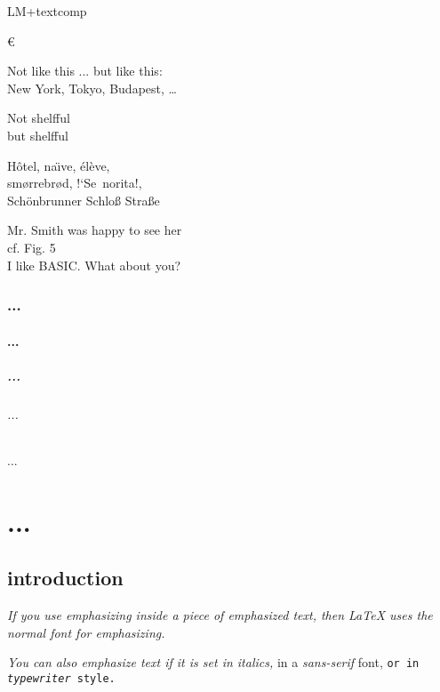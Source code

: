 \documentclass[a4paper,11pt]{book}
\begin{document}
	\texteuro
	
	LM+textcomp \texteuro
	
	\euro
	
	Not like this ... but like
	this:\\ New York, Tokyo,
	Budapest, \ldots
	
	Not shelfful\\
	but shelf\mbox{}ful
	
	H\^otel, na\"\i ve, \'el\`eve,\\
	sm\o rrebr\o d, !‘Se\ norita!,\\
	Sch\"onbrunner Schlo\ss{}
	Stra\ss e
	
	Mr. Smith was happy to see her\\
	cf. Fig. 5\\\frenchspacing
	I like BASIC\@. \frenchspacing What about you?
	
	\section{...}
	\subsection{...}
	\subsubsection{...}
	\paragraph{...}
	\subparagraph{...}
	
	\part{...}
	
	\chapter{introduction}
	
	\emph{If you use
		emphasizing inside a piece
		of emphasized text, then
		\LaTeX{} uses the
		\emph{normal} font for
		emphasizing.}
	
	
	\textit{You can also
		\emph{emphasize} text if
		it is set in italics,}
	\textsf{in a
		\emph{sans-serif} font,}
	\texttt{or in
		\emph{typewriter} style.}
	
	
\end{document}
